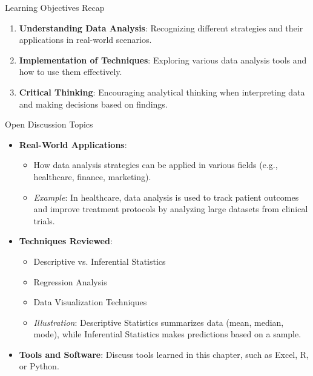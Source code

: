 \documentclass[aspectratio=169]{beamer}
\begin{document}
\begin{frame}[fragile]{Learning Objectives Recap}
    \begin{enumerate}
        \item \textbf{Understanding Data Analysis}: Recognizing different strategies and their applications in real-world scenarios.
        \item \textbf{Implementation of Techniques}: Exploring various data analysis tools and how to use them effectively.
        \item \textbf{Critical Thinking}: Encouraging analytical thinking when interpreting data and making decisions based on findings.
    \end{enumerate}
\end{frame}

\begin{frame}[fragile]{Open Discussion Topics}
    \begin{itemize}
        \item \textbf{Real-World Applications}:
            \begin{itemize}
                \item How data analysis strategies can be applied in various fields (e.g., healthcare, finance, marketing).
                \item \textit{Example}: In healthcare, data analysis is used to track patient outcomes and improve treatment protocols by analyzing large datasets from clinical trials.
            \end{itemize}
        
        \item \textbf{Techniques Reviewed}:
            \begin{itemize}
                \item Descriptive vs. Inferential Statistics
                \item Regression Analysis
                \item Data Visualization Techniques
                \item \textit{Illustration}: 
                    Descriptive Statistics summarizes data (mean, median, mode), while Inferential Statistics makes predictions based on a sample.
            \end{itemize}
        
        \item \textbf{Tools and Software}: Discuss tools learned in this chapter, such as Excel, R, or Python.
    \end{itemize}
\end{frame}
\end{document}
